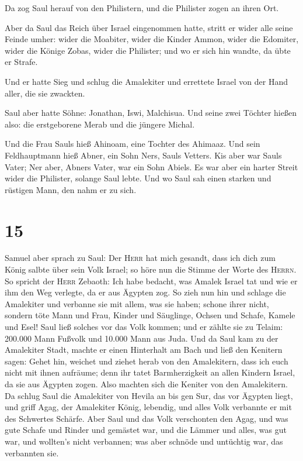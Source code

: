  Da zog Saul herauf von den Philistern, und die Philister
zogen an ihren Ort.

 Aber da Saul das Reich über Israel eingenommen hatte,
stritt er wider alle seine Feinde umher: wider die Moabiter, wider die
Kinder Ammon, wider die Edomiter, wider die Könige Zobas, wider die
Philister; und wo er sich hin wandte, da übte er Strafe.

 Und er hatte Sieg und schlug die Amalekiter und
errettete Israel von der Hand aller, die sie zwackten.

 Saul aber hatte Söhne: Jonathan, Iswi, Malchisua. Und
seine zwei Töchter hießen also: die erstgeborene Merab und die jüngere
Michal.

 Und die Frau Sauls hieß Ahinoam, eine Tochter des
Ahimaaz. Und sein Feldhauptmann hieß Abner, ein Sohn Ners, Sauls
Vetters.  Kis aber war Sauls Vater; Ner aber, Abners
Vater, war ein Sohn Abiels.  Es war aber ein harter
Streit wider die Philister, solange Saul lebte. Und wo Saul sah einen
starken und rüstigen Mann, den nahm er zu sich.

\hypertarget{section-14}{%
\section{15}\label{section-14}}

 Samuel aber sprach zu Saul: Der \textsc{Herr} hat mich
gesandt, dass ich dich zum König salbte über sein Volk Israel; so höre
nun die Stimme der Worte des \textsc{Herrn}.  So spricht
der \textsc{Herr} Zebaoth: Ich habe bedacht, was Amalek Israel tat und
wie er ihm den Weg verlegte, da er aus Ägypten zog.  So
zieh nun hin und schlage die Amalekiter und verbanne sie mit allem, was
sie haben; schone ihrer nicht, sondern töte Mann und Frau, Kinder und
Säuglinge, Ochsen und Schafe, Kamele und Esel!  Saul ließ
solches vor das Volk kommen; und er zählte sie zu Telaim: 200.000 Mann
Fußvolk und 10.000 Mann aus Juda.  Und da Saul kam zu der
Amalekiter Stadt, machte er einen Hinterhalt am Bach  und
ließ den Kenitern sagen: Gehet hin, weichet und ziehet herab von den
Amalekitern, dass ich euch nicht mit ihnen aufräume; denn ihr tatet
Barmherzigkeit an allen Kindern Israel, da sie aus Ägypten zogen. Also
machten sich die Keniter von den Amalekitern.  Da schlug
Saul die Amalekiter von Hevila an bis gen Sur, das vor Ägypten liegt,
 und griff Agag, der Amalekiter König, lebendig, und alles
Volk verbannte er mit des Schwertes Schärfe.  Aber Saul
und das Volk verschonten den Agag, und was gute Schafe und Rinder und
gemästet war, und die Lämmer und alles, was gut war, und wollten's nicht
verbannen; was aber schnöde und untüchtig war, das verbannten sie.

